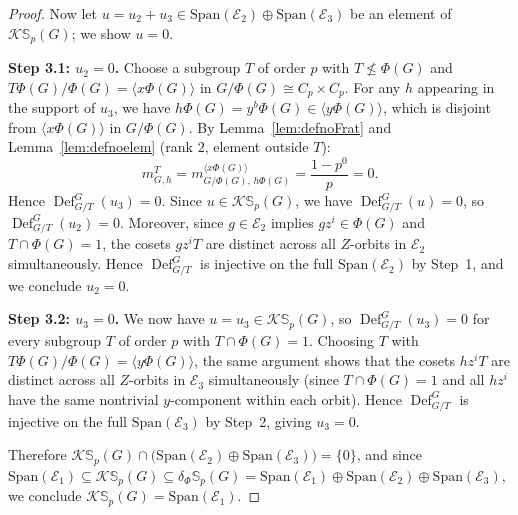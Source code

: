 \documentclass[12pt]{article}
\theoremstyle{plain}
\theoremstyle{definition}
\newcommand{\kerlin}{\mathbb S_p}
\newcommand{\defl}{\operatorname{Def}}
\begin{document}
\begin{proof}
Now let $u = u_2 + u_3 \in \mathrm{Span}(\mathcal{E}_2) \oplus \mathrm{Span}(\mathcal{E}_3)$
be an element of $\mathcal{K}\kerlin(G)$; we show $u = 0$.

\textbf{Step 3.1: $u_2 = 0$.} Choose a subgroup $T$ of order $p$ with
$T \not\leq \Phi(G)$ and $T\Phi(G)/\Phi(G) = \langle x\Phi(G) \rangle$ in 
$G/\Phi(G) \cong C_p \times C_p$.
For any $h$ appearing in the support of $u_3$, we have $h\Phi(G) = y^b\Phi(G) \in 
\langle y\Phi(G) \rangle$, which is disjoint from $\langle x\Phi(G) \rangle$ in 
$G/\Phi(G)$. By Lemma~\ref{lem:defnoFrat} and Lemma~\ref{lem:defnoelem} 
(rank $2$, element outside $T$):
\[
m_{G,h}^T = m_{G/\Phi(G),\, h\Phi(G)}^{\langle x\Phi(G)\rangle} = \frac{1 - p^0}{p} = 0.
\]
Hence $\defl^G_{G/T}(u_3) = 0$. Since $u \in \mathcal{K}\kerlin(G)$, we have
$\defl^G_{G/T}(u) = 0$, so $\defl^G_{G/T}(u_2) = 0$.
Moreover, since $g \in \mathcal{E}_2$ implies $gz^i \in \Phi(G)$ and 
$T \cap \Phi(G) = 1$, the cosets $gz^iT$ are distinct across all $Z$-orbits 
in $\mathcal{E}_2$ simultaneously. Hence $\defl^G_{G/T}$ is injective on the 
full $\mathrm{Span}(\mathcal{E}_2)$ by Step~1, and we conclude $u_2 = 0$.

\textbf{Step 3.2: $u_3 = 0$.} We now have $u = u_3 \in \mathcal{K}\kerlin(G)$,
so $\defl^G_{G/T}(u_3) = 0$ for every subgroup $T$ of order $p$ with 
$T \cap \Phi(G) = 1$. Choosing $T$ with $T\Phi(G)/\Phi(G) = \langle y\Phi(G) \rangle$, 
the same argument shows that the cosets $hz^iT$ are distinct across all $Z$-orbits 
in $\mathcal{E}_3$ simultaneously (since $T \cap \Phi(G) = 1$ and all $hz^i$ have 
the same nontrivial $y$-component within each orbit). Hence $\defl^G_{G/T}$ is 
injective on the full $\mathrm{Span}(\mathcal{E}_3)$ by Step~2, giving $u_3 = 0$.

Therefore $\mathcal{K}\kerlin(G) \cap \bigl(\mathrm{Span}(\mathcal{E}_2) \oplus
\mathrm{Span}(\mathcal{E}_3)\bigr) = \{0\}$, and since
$\mathrm{Span}(\mathcal{E}_1) \subseteq \mathcal{K}\kerlin(G) \subseteq
\delta_\Phi\kerlin(G) = \mathrm{Span}(\mathcal{E}_1) \oplus \mathrm{Span}(\mathcal{E}_2) 
\oplus \mathrm{Span}(\mathcal{E}_3)$, we conclude
$\mathcal{K}\kerlin(G) = \mathrm{Span}(\mathcal{E}_1)$.
\end{proof}
\end{document}
